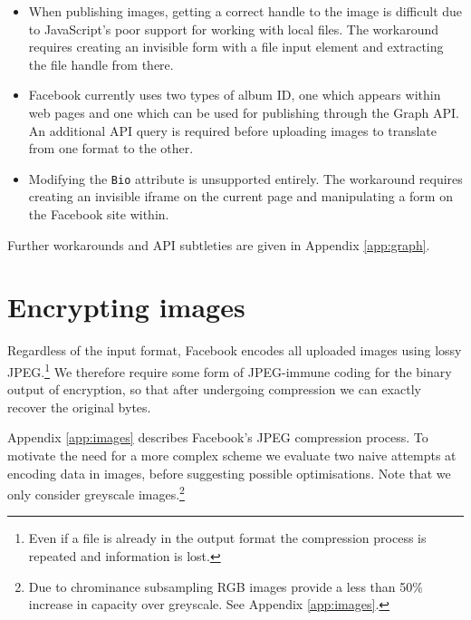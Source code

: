 \begin{itemize}

    \item When publishing images, getting a correct handle to the image is difficult due to JavaScript's poor support for working with local files. The workaround requires creating an invisible form with a file input element and extracting the file handle from there.

    \item Facebook currently uses two types of album ID, one which appears within web pages and one which can be used for publishing through the Graph API. An additional API query is required before uploading images to translate from one format to the other.
    
    \item Modifying the {\tt Bio} attribute is unsupported entirely. The workaround requires creating an invisible iframe on the current page and manipulating a form on the Facebook site within.

\end{itemize}

Further workarounds and API subtleties are given in Appendix \ref{app:graph}.



    
\FloatBarrier
\section{Encrypting images}
\label{ssec:images}


Regardless of the input format, Facebook encodes all uploaded images using lossy JPEG.\footnote{Even if a file is already in the output format the compression process is repeated and information is lost.} We therefore require some form of JPEG-immune coding for the binary output of encryption, so that after undergoing compression we can exactly recover the original bytes.

Appendix \ref{app:images} describes Facebook's JPEG compression process. To motivate the need for a more complex scheme we evaluate two naive attempts at encoding data in images, before suggesting possible optimisations. Note that we only consider greyscale images.\footnote{Due to chrominance subsampling RGB images provide a less than 50\% increase in capacity over greyscale. See Appendix \ref{app:images}.}


